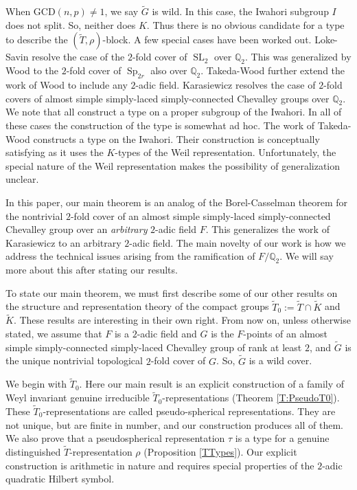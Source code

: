 \documentclass[10pt, letterpaper]{amsart}
\theoremstyle{plain}
\theoremstyle{definition}
\numberwithin{equation}{section}
\newcommand{\SL}{\operatorname{SL}}
\newcommand{\Sp}{\operatorname{Sp}}
\newcommand{\Gt}{\widetilde{G}}
\newcommand{\Kt}{\widetilde{K}}
\newcommand{\Tt}{\widetilde{T}}
\begin{document}
When $\mathrm{GCD}(n,p)\neq 1$, we say $\Gt$ is wild. In this case, the Iwahori subgroup $I$ does not split. So, neither does $K$. Thus there is no obvious candidate for a type to describe the $(\Tt,\rho)$-block. A few special cases have been worked out. Loke-Savin \cite{LS10a} resolve the case of the $2$-fold cover of $\SL_{2}$ over $\mathbb{Q}_{2}$. This was generalized by Wood \cite{Wood} to the $2$-fold cover of $\Sp_{2r}$ also over $\mathbb{Q}_{2}$. Takeda-Wood \cite{Takeda_Wood} further extend the work of Wood to include any $2$-adic field. Karasiewicz \cite{Karasiewicz} resolves the case of $2$-fold covers of almost simple simply-laced simply-connected Chevalley groups over $\mathbb{Q}_{2}$. We note that \cite{Wood,LS10a,Karasiewicz} all construct a type on a proper subgroup of the Iwahori. In all of these cases the construction of the type is somewhat ad hoc. The work of Takeda-Wood \cite{Takeda_Wood} constructs a type on the Iwahori. Their construction is conceptually satisfying as it uses the $K$-types of the Weil representation. Unfortunately, the special nature of the Weil representation makes the possibility of generalization unclear. %

In this paper, our main theorem is an analog of the Borel-Casselman theorem for the nontrivial $2$-fold cover of an almost simple simply-laced simply-connected Chevalley group over an \textit{arbitrary} $2$-adic field $F$. This generalizes the work of Karasiewicz \cite{Karasiewicz} to an arbitrary $2$-adic field. The main novelty of our work is how we address the technical issues arising from the ramification of $F/\mathbb{Q}_{2}$. We will say more about this after stating our results.

To state our main theorem, we must first describe some of our other results on the structure and representation theory of the compact groups $\Tt_{0}:=\Tt\cap \Kt$ and $\Kt$. These results are interesting in their own right. From now on, unless otherwise stated, we assume that $F$ is a $2$-adic field and $G$ is the $F$-points of an almost simple simply-connected simply-laced Chevalley group of rank at least $2$, and $\Gt$ is the unique nontrivial topological $2$-fold cover of $G$. So, $\Gt$ is a wild cover.

We begin with $\Tt_{0}$. Here our main result is an explicit construction of a family of Weyl invariant genuine irreducible $\Tt_{0}$-representations (Theorem \ref{T:PseudoT0}). These $\Tt_{0}$-representations are called pseudo-spherical representations. They are not unique, but are finite in number, and our construction produces all of them. We also prove that a pseudospherical representation $\tau$ is a type for a genuine distinguished $\Tt$-representation $\rho$ (Proposition \ref{TTypes}). Our explicit construction is arithmetic in nature and requires special properties of the $2$-adic quadratic Hilbert symbol.
\end{document}
